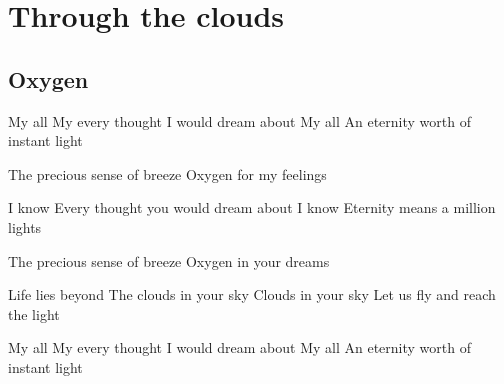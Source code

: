 \documentclass{article}
\newenvironment{album}[1]%
{%
  \section*{#1}
}%
{%
}
\newenvironment{song}[1]%
{%
  \subsection*{\textbf{#1}}
  \begin{multicols*}{2}
}%
{%
  \end{multicols*}
  \newpage
}
\newenvironment{couplet} %
{%
  \verbatim
}%
{% end code
  \endverbatim
}
\newenvironment{refrain} %
{%
  \verbatim
}%
{% end code
  \endverbatim
}
\newenvironment{pont} %
{%
  \verbatim
}%
{% end code
  \endverbatim
}
\begin{document}
\begin{album}{Through the clouds}
\begin{song}{Oxygen}
\begin{couplet}
My all
My every thought I would dream about
My all
An eternity worth of instant light  
\end{couplet}
\begin{refrain}
The precious sense of breeze
Oxygen for my feelings  
\end{refrain}
\begin{couplet}
I know
Every thought you would dream about
I know
Eternity means a million lights
\end{couplet}
\begin{refrain}
The precious sense of breeze
Oxygen in your dreams  
\end{refrain}  
\begin{pont}
Life lies beyond
The clouds in your sky
Clouds in your sky
Let us fly and reach the light  
\end{pont}
\begin{couplet}
My all
My every thought I would dream about
My all
An eternity worth of instant light  
\end{couplet}
\end{song}


\end{album}
\end{document}
